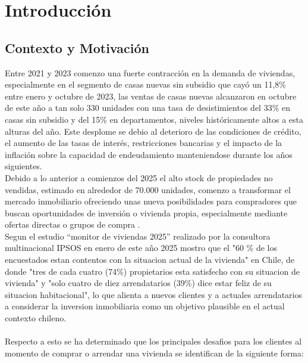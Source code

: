 
\section{Introducción}

\subsection{Contexto y Motivación}

Entre 2021 y 2023 comenzo una fuerte contracción en la demanda de viviendas, especialmente en el segmento de casas nuevas sin subsidio que cayó un 11,8\% entre enero y octubre de 2023, las ventas de casas nuevas alcanzaron en octubre de este año a tan solo 330 unidades con una tasa de desistimientos del 33\% en casas sin subsidio y del 15\% en departamentos, niveles históricamente altos a esta alturas del año. Este desplome se debio al deterioro de las condiciones de crédito, el aumento de las tasas de interés, restricciones bancarias y el impacto de la inflación sobre la capacidad de endeudamiento manteniendose durante los años siguientes.
\\ 
Debido a lo anterior a comienzos del 2025 el alto stock de propiedades no vendidas, estimado en alrededor de 70.000 unidades, comenzo a transformar el mercado inmobiliario ofreciendo unas nueva posibilidades para compradores que buscan oportunidades de inversión o vivienda propia, especialmente mediante ofertas directas o grupos de compra \cite{biobio_ciper_2025}.
\\Segun el estudio ``monitor de viviendas 2025'' \cite{ipsos_monitor_2025} realizado por la consultora multinacional IPSOS en enero de este año 2025 mostro que el "60 \% de los encuestados estan contentos con la situacion actual de la vivienda" en Chile, de donde "tres de cada cuatro (74\%) propietarios esta satisfecho con su situacion de vivienda" y "solo cuatro de diez arrendatarios (39\%) dice estar feliz de su situacion habitacional", lo que alienta a nuevos clientes y a actuales arrendatarios a considerar la inversion inmobiliaria como un objetivo plausible en el actual contexto chileno.
\\
\\Respecto a esto se ha determinado que los principales desafios para los clientes al momento de comprar o arrendar una vivienda se identifican de la siguiente forma:

